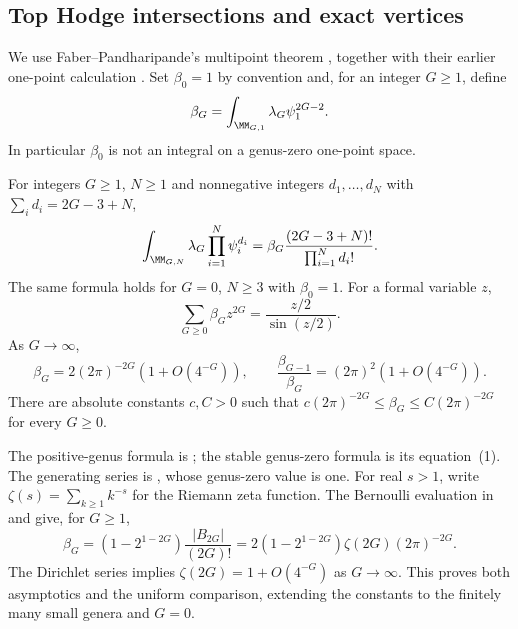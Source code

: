 \subsection{Top Hodge intersections and exact vertices}
\label{subsec:s06:01}

We use Faber--Pandharipande's multipoint theorem
\cite[Theorem~1]{FP03}, together with their earlier one-point
calculation \cite[Theorem~2, (6)]{FP00}. Set $\beta_0=1$ by
convention and, for an integer $G\geq1$, define
\begin{equation}\label{eq:s06:beta-definition}
 \beta_G=\int_{\MM_{G,1}}\lambda_G\psi_1^{2G-2}.
\end{equation}
In particular $\beta_0$ is not an integral on a genus-zero one-point
space.

\begin{thm}\label{thm:s06:lambda-g}
For integers $G\geq1$, $N\geq1$ and nonnegative integers
$d_1,\ldots,d_N$ with $\sum_i d_i=2G-3+N$,
\begin{equation}\label{eq:s06:lambda-g}
 \int_{\MM_{G,N}}\lambda_G\prod_{i=1}^N\psi_i^{d_i}
 =\beta_G\frac{(2G-3+N)!}{\prod_{i=1}^N d_i!}.
\end{equation}
The same formula holds for $G=0$, $N\geq3$ with $\beta_0=1$.
For a formal variable $z$,
\begin{equation}\label{eq:s06:beta-series}
 \sum_{G\geq0}\beta_Gz^{2G}=\frac{z/2}{\sin(z/2)}.
\end{equation}
As $G\to\infty$,
\begin{equation}\label{eq:s06:beta-asymptotics}
 \beta_G=2(2\pi)^{-2G}(1+O(4^{-G})),\qquad
 \frac{\beta_{G-1}}{\beta_G}=(2\pi)^2(1+O(4^{-G})).
\end{equation}
There are absolute constants $c,C>0$ such that
$c(2\pi)^{-2G}\leq\beta_G\leq C(2\pi)^{-2G}$ for every $G\geq0$.
\end{thm}
\begin{prf}
The positive-genus formula is \cite[Theorem~1]{FP03}; the
stable genus-zero formula is its equation~(1). The generating
series is \cite[Theorem~2, (6)]{FP00}, whose genus-zero value is
one. For real $s>1$, write
$\zeta(s)=\sum_{k\geq1}k^{-s}$ for the Riemann zeta function.
The Bernoulli evaluation in \cite[\S 4.2, Lemma~1]{FP00}
and \cite[(25.6.2)]{DLMF} give, for $G\geq1$,
\[
 \beta_G=(1-2^{1-2G})\frac{|B_{2G}|}{(2G)!}
       =2(1-2^{1-2G})\zeta(2G)(2\pi)^{-2G}.
\]
The Dirichlet series \cite[(25.2.1)]{DLMF} implies
$\zeta(2G)=1+O(4^{-G})$ as $G\to\infty$.
This proves both asymptotics and the uniform comparison, extending
the constants to the finitely many small genera and $G=0$.
\end{prf}

